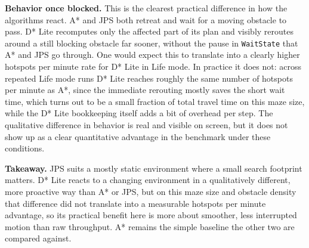 \documentclass[11pt,a4paper]{article}
\begin{document}
\textbf{Behavior once blocked.} This is the clearest practical difference in how the algorithms react. A* and JPS both retreat and wait for a moving obstacle to pass. D* Lite recomputes only the affected part of its plan and visibly reroutes around a still blocking obstacle far sooner, without the pause in \texttt{WaitState} that A* and JPS go through. One would expect this to translate into a clearly higher hotspots per minute rate for D* Lite in Life mode. In practice it does not: across repeated Life mode runs D* Lite reaches roughly the same number of hotspots per minute as A*, since the immediate rerouting mostly saves the short wait time, which turns out to be a small fraction of total travel time on this maze size, while the D* Lite bookkeeping itself adds a bit of overhead per step. The qualitative difference in behavior is real and visible on screen, but it does not show up as a clear quantitative advantage in the benchmark under these conditions.

\textbf{Takeaway.} JPS suits a mostly static environment where a small search footprint matters. D* Lite reacts to a changing environment in a qualitatively different, more proactive way than A* or JPS, but on this maze size and obstacle density that difference did not translate into a measurable hotspots per minute advantage, so its practical benefit here is more about smoother, less interrupted motion than raw throughput. A* remains the simple baseline the other two are compared against.
\end{document}
